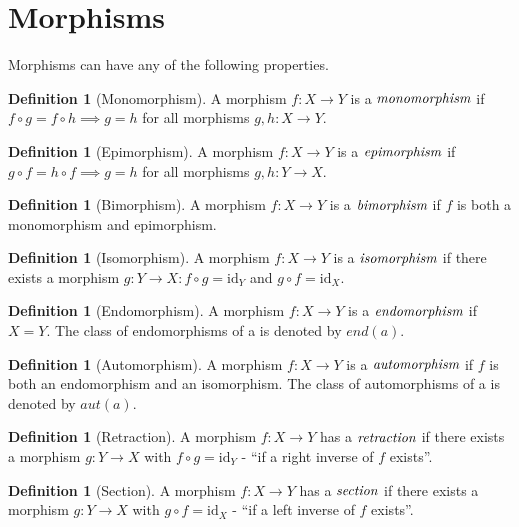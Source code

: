 \documentclass[10pt, oneside, reqno]{amsart}
\theoremstyle{plain}%
\theoremstyle{definition}
\newtheorem{defn}[thm]{Definition}
\theoremstyle{remark}
\newcommand{\id}{\mbox{id}_}
\begin{document}
\section{Morphisms} %
\label{sec:morphisms}
Morphisms can have any of the following properties.

\begin{defn}[Monomorphism]
 A morphism $f: X \to Y$ is a $\emph{monomorphism}$ if $f \circ g = f \circ h \implies g = h$ for all morphisms $g,h: X \to Y$.
\end{defn}

\begin{defn}[Epimorphism]
 A morphism $f: X \to Y$ is a $\emph{epimorphism}$ if $g \circ f = h \circ f \implies g = h$ for all morphisms $g,h: Y \to X$.
\end{defn}
 
\begin{defn}[Bimorphism]
 A morphism $f: X \to Y$ is a $\emph{bimorphism}$ if $f$ is both a monomorphism and epimorphism.
\end{defn}

\begin{defn}[Isomorphism]
 A morphism $f: X \to Y$ is a $\emph{isomorphism}$ if there exists a morphism $g: Y \to X : f \circ g = \id{Y}$ and $g \circ f = \id{X}$.
\end{defn}

\begin{defn}[Endomorphism]
 A morphism $f: X \to Y$ is a $\emph{endomorphism}$ if $X = Y$.
 The class of endomorphisms of a is denoted by $end(a)$.
\end{defn}

\begin{defn}[Automorphism]
 A morphism $f: X \to Y$ is a $\emph{automorphism}$ if $f$ is both an endomorphism and an isomorphism.
 The class of automorphisms of a is denoted by $aut(a)$.
\end{defn}

\begin{defn}[Retraction]
 A morphism $f: X \to Y$ has a $\emph{retraction}$ if there exists a morphism $g: Y \to X$ with $f \circ g = \id{Y}$ - ``if a right inverse of $f$ exists''.
\end{defn}

\begin{defn}[Section]
 A morphism $f: X \to Y$ has a $\emph{section}$ if there exists a morphism $g: Y \to X$ with $g \circ f = \id{X}$ - ``if a left inverse of $f$ exists''.
\end{defn}
\end{document}
